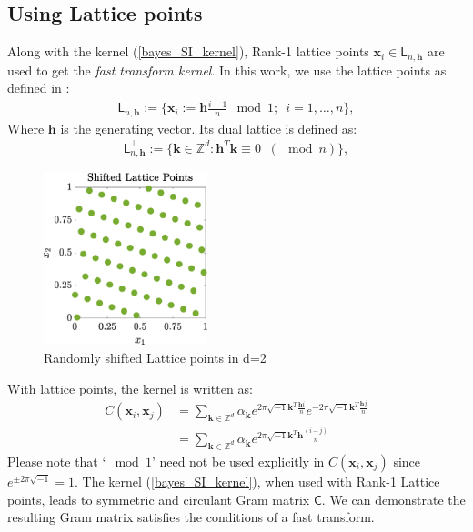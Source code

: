 \documentclass[twocolumn]{svjour3}          %
\newcommand{\bm}[1]{\boldsymbol{#1}}
\newcommand{\vh}{\bm{h}}
\newcommand{\vk}{\bm{k}}
\newcommand{\vx}{\bm{x}}
\newcommand{\mC}{\mathsf{C}}
\begin{document}
\subsection{Using Lattice points}
Along with the kernel (\ref{bayes_SI_kernel}), Rank-1 lattice points $\vx_i \in \mathsf{L}_{n,\bm{h}}$ are used to get the \textit{fast transform kernel}. 
In this work, we use the lattice points as defined in \cite{Rank1Lattice}:
\begin{align*}
\mathsf{L}_{n,\bm{h}} := \lbrace \vx_i :=  \bm{h} \frac{ i-1}{n} \mod 1 ;\ \; i=1,\hdots,n
\rbrace,
\end{align*}
Where $\bm{h}$ is the generating vector.
Its dual lattice is defined as:
\begin{align*}
\mathsf{L}_{n,\bm{h}}^{\perp } := 
\lbrace 
\vk \in \mathbb{Z}^d : \vh^T \vk \equiv 0 \;\;  (\mod n)
\rbrace,
\end{align*}


\begin{figure}[htp]
\centering
    \includegraphics[height=5cm]{ShiftedLatticePoints}
    \caption{Randomly shifted Lattice points in d=2  }
\end{figure}


With lattice points, the kernel is written as:
\begin{align*}
C(\vx_i, \vx_j)
 &=
\sum_{\vk \in \mathbb{Z}^d} \alpha_{\vk}  
e^{ 2 \pi\sqrt{-1} \vk^T  \frac{\bm{h} i}{n}}
e^{-2 \pi\sqrt{-1} \vk^T  \frac{\bm{h} j}{n}}
\\
 &=
\sum_{\vk \in \mathbb{Z}^d} \alpha_{\vk}  
e^{2 \pi\sqrt{-1} \vk^T \bm{h} \frac{(i-j)}{n}}
\end{align*}
Please note that `$\mod 1$' need not be used explicitly in $C(\vx_i, \vx_j)$ since 
$
e^{\pm 2 \pi \sqrt{-1}} = 1
$. 
The kernel (\ref{bayes_SI_kernel}), when used with Rank-1 Lattice points, leads to symmetric and circulant Gram matrix $\mC$.
We can demonstrate the resulting Gram matrix satisfies the conditions of a fast transform. 
\end{document}
